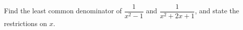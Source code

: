 Find the least common denominator of $\dfrac{1}{x^2-1}$ and $\dfrac{1}{x^2+2x+1}$, and state the restrictions on $x$.

